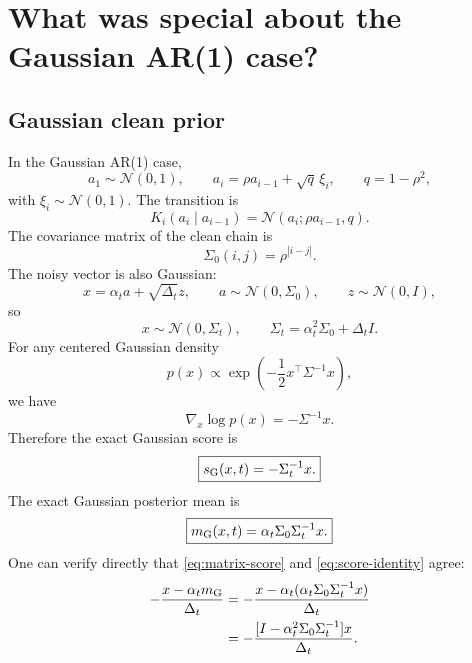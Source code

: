 \documentclass[11pt]{article}
\newcommand{\Normal}{\mathcal{N}}
\begin{document}
\section{What was special about the Gaussian AR(1) case?}

\subsection{Gaussian clean prior}

In the Gaussian AR(1) case,
\begin{equation}
  a_1\sim\Normal(0,1),
  \qquad
  a_i=\rho a_{i-1}+\sqrt{q}\,\xi_i,
  \qquad q=1-\rho^2,
\end{equation}
with \(\xi_i\sim\Normal(0,1)\). The transition is
\begin{equation}
  K_i(a_i\mid a_{i-1})=\Normal(a_i;\rho a_{i-1},q).
\end{equation}
The covariance matrix of the clean chain is
\begin{equation}
  \Sigma_0(i,j)=\rho^{|i-j|}.
\end{equation}
The noisy vector is also Gaussian:
\begin{equation}
  x=\alpha_t a+\sqrt{\Delta_t}z,
  \qquad
  a\sim\Normal(0,\Sigma_0),
  \qquad
  z\sim\Normal(0,I),
\end{equation}
so
\begin{equation}
  x\sim\Normal(0,\Sigma_t),
  \qquad
  \Sigma_t=\alpha_t^2\Sigma_0+\Delta_t I.
\end{equation}
For any centered Gaussian density
\[
  p(x)\propto \exp\left(-\frac12 x^\top\Sigma^{-1}x\right),
\]
we have
\begin{equation}
  \nabla_x\log p(x)=-\Sigma^{-1}x.
\end{equation}
Therefore the exact Gaussian score is
\begin{equation}
  \boxed{s_{\rm G}(x,t)=-\Sigma_t^{-1}x.}
  \label{eq:matrix-score}
\end{equation}
The exact Gaussian posterior mean is
\begin{equation}
  \boxed{m_{\rm G}(x,t)=\alpha_t\Sigma_0\Sigma_t^{-1}x.}
  \label{eq:gaussian-posterior-mean}
\end{equation}
One can verify directly that \eqref{eq:matrix-score} and \eqref{eq:score-identity} agree:
\begin{align}
  -\frac{x-\alpha_t m_{\rm G}}{\Delta_t}
  &= -\frac{x-\alpha_t(\alpha_t\Sigma_0\Sigma_t^{-1}x)}{\Delta_t}\\
  &= -\frac{[I-\alpha_t^2\Sigma_0\Sigma_t^{-1}]x}{\Delta_t}.
\end{align}
\end{document}
